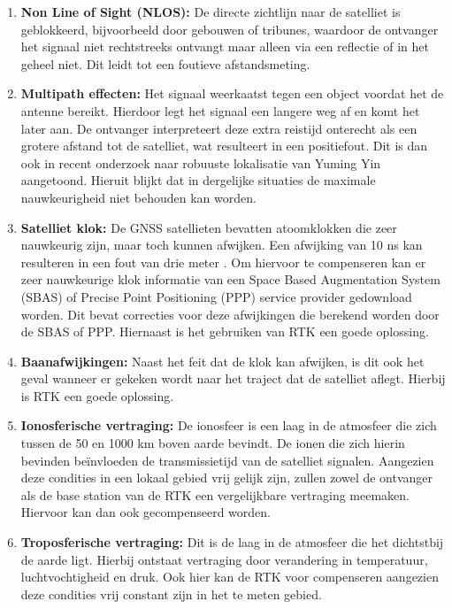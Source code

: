 \begin{enumerate}
	\item \textbf{Non Line of Sight (NLOS):} De directe zichtlijn naar de satelliet is geblokkeerd, bijvoorbeeld door gebouwen of tribunes, waardoor de ontvanger het signaal niet rechtstreeks ontvangt maar alleen via een reflectie of in het geheel niet. Dit leidt tot een foutieve afstandsmeting. 
	\item \textbf{Multipath effecten:} Het signaal weerkaatst tegen een object voordat het de antenne bereikt. Hierdoor legt het signaal een langere weg af en komt het later aan. De ontvanger interpreteert deze extra reistijd onterecht als een grotere afstand tot de satelliet, wat resulteert in een positiefout. Dit is dan ook in recent onderzoek naar robuuste lokalisatie van Yuming Yin \cite{pmc_sensorfusion} aangetoond. Hieruit blijkt dat in dergelijke situaties de maximale nauwkeurigheid niet behouden kan worden.
	\item \textbf{Satelliet klok:} De GNSS satellieten bevatten atoomklokken die zeer nauwkeurig zijn, maar toch kunnen afwijken. Een afwijking van 10 ns kan resulteren in een fout van drie meter \cite{NovAtelGNSSerrorSources2026}. Om hiervoor te compenseren kan er zeer nauwkeurige klok informatie van een Space Based Augmentation System (SBAS) of Precise Point Positioning (PPP) service provider gedownload worden. Dit bevat correcties voor deze afwijkingen die berekend worden door de SBAS of PPP. Hiernaast is het gebruiken van RTK een goede oplossing.
	\item \textbf{Baanafwijkingen:} Naast het feit dat de klok kan afwijken, is dit ook het geval wanneer er gekeken wordt naar het traject dat de satelliet aflegt. Hierbij is RTK een goede oplossing.
	\item \textbf{Ionosferische vertraging:} De ionosfeer is een laag in de atmosfeer die zich tussen de 50 en 1000 km boven aarde bevindt. De ionen die zich hierin bevinden beïnvloeden de transmissietijd van de satelliet  signalen. Aangezien deze condities in een lokaal gebied vrij gelijk zijn, zullen zowel de ontvanger als de base station van de RTK een vergelijkbare vertraging meemaken. Hiervoor kan dan ook gecompenseerd worden.
	\item \textbf{Troposferische vertraging:} Dit is de laag in de atmosfeer die het dichtstbij de aarde ligt. Hierbij ontstaat vertraging door verandering in temperatuur, luchtvochtigheid en druk. Ook hier kan de RTK voor compenseren aangezien deze condities vrij constant zijn in het te meten gebied.
\end{enumerate}

